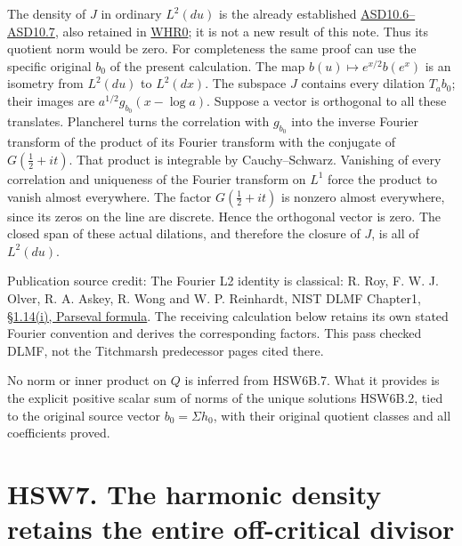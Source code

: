 The density of \(J\) in ordinary \(L^2(du)\) is the already established
\href{https://github.com/KokunoYumeto/zeta-function-research-reader/blob/36a82ecca98addb8a98b48204e349737856c7223/workbenches/splitzero-tandem/continuations/20260924-cohomology-weight-and-character-lifts/original-character-lifting/tau_lifting_weights_20260924/ACTUAL_SUPPORTED_DUALITY_INDEPENDENT.md}{ASD10.6--ASD10.7},
also retained in
\href{https://github.com/KokunoYumeto/zeta-function-research-reader/blob/main/workbenches/splitzero-tandem/continuations/20260925-full-source-tensor-and-original-divisor/counterfactual/WEIGHTED_HILBERT_RETURN_AND_EXACT_KERNEL.md}{WHR0};
it is not a new result of this note. Thus its quotient norm would be
zero. For completeness the same proof can use the specific original
\(b_0\) of the present calculation. The map
\(b(u)\mapsto e^{x/2}b(e^x)\) is an isometry from \(L^2(du)\) to
\(L^2(dx)\). The subspace \(J\) contains every dilation \(T_a b_0\);
their images are \(a^{1/2}g_{b_0}(x-\log a)\). Suppose a vector is
orthogonal to all these translates. Plancherel turns the correlation
with \(g_{b_0}\) into the inverse Fourier transform of the product of
its Fourier transform with the conjugate of \(G(\tfrac12+it)\). That
product is integrable by Cauchy--Schwarz. Vanishing of every correlation
and uniqueness of the Fourier transform on \(L^1\) force the product to
vanish almost everywhere. The factor \(G(\tfrac12+it)\) is nonzero
almost everywhere, since its zeros on the line are discrete. Hence the
orthogonal vector is zero. The closed span of these actual dilations,
and therefore the closure of \(J\), is all of \(L^2(du)\).

Publication source credit: The Fourier L2 identity is classical: R. Roy,
F. W. J. Olver, R. A. Askey, R. Wong and W. P. Reinhardt, NIST DLMF
Chapter1, \href{https://dlmf.nist.gov/1.14\#i}{§1.14(i), Parseval
formula}. The receiving calculation below retains its own stated Fourier
convention and derives the corresponding factors. This pass checked
DLMF, not the Titchmarsh predecessor pages cited there.

No norm or inner product on \(Q\) is inferred from HSW6B.7. What it
provides is the explicit positive scalar sum of norms of the unique
solutions HSW6B.2, tied to the original source vector
\(b_0=\Sigma h_0\), with their original quotient classes and all
coefficients proved.

\section{HSW7. The harmonic density retains the entire off-critical
divisor}\label{hsw7.-the-harmonic-density-retains-the-entire-off-critical-divisor}

